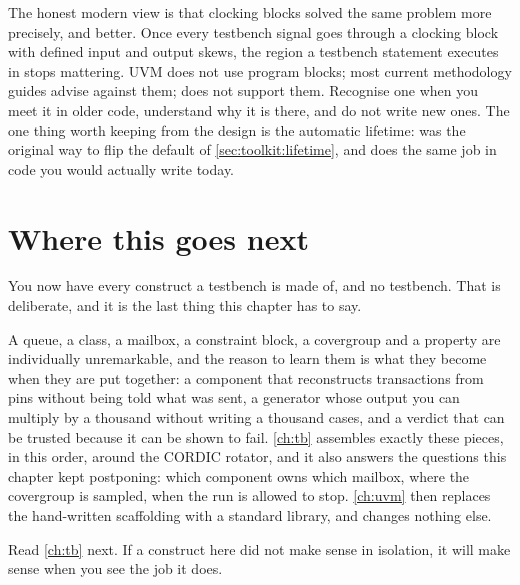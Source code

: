 
The honest modern view is that clocking blocks solved the same problem more
precisely, and better. Once every testbench signal goes through a clocking
block with defined input and output skews, the region a testbench statement
executes in stops mattering. UVM does not use program blocks; most current
methodology guides advise against them;  does not support
them. Recognise one when you meet it in older code, understand why it is
there, and do not write new ones. The one thing worth keeping from the design
is the automatic lifetime:  was the original way to
flip the default of \cref{sec:toolkit:lifetime}, and 
does the same job in code you would actually write today.

\section{Where this goes next}
\label{sec:toolkit:next}

You now have every construct a \SV{} testbench is made of, and no testbench.
That is deliberate, and it is the last thing this chapter has to say.

A queue, a class, a mailbox, a constraint block, a covergroup and a property
are individually unremarkable, and the reason to learn them is what they
become when they are put together: a component that reconstructs transactions
from pins without being told what was sent, a generator whose output you can
multiply by a thousand without writing a thousand cases, and a verdict that
can be trusted because it can be shown to fail. \cref{ch:tb} assembles exactly
these pieces, in this order, around the CORDIC rotator, and it also answers
the questions this chapter kept postponing: which component owns which
mailbox, where the covergroup is sampled, when the run is allowed to stop.
\cref{ch:uvm} then replaces the hand-written scaffolding with a standard
library, and changes nothing else.

Read \cref{ch:tb} next. If a construct here did not make sense in isolation,
it will make sense when you see the job it does.

